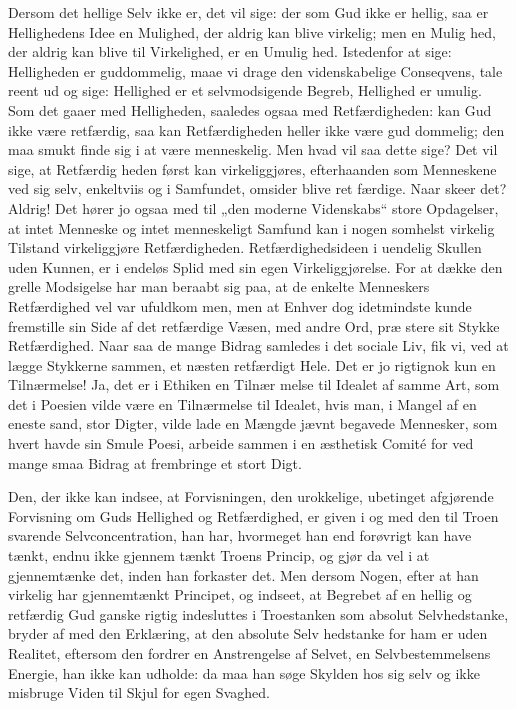 \documentclass[12pt]{book}
\newcommand{\opage}[1]{\marginnote{\footnotesize\textit{[#1]}}}
\begin{document}
Dersom det hellige Selv ikke er, det vil sige: der\-%
som Gud ikke er hellig, saa er Hellighedens Idee en
Mulighed, der aldrig kan blive virkelig; men en Mulig\-%
hed, der aldrig kan blive til Virkelighed, er en Umulig\-%
hed. Istedenfor at sige: Helligheden er guddommelig,
maae vi drage den videnskabelige Conseqvens, tale reent
ud og sige: Hellighed er et selvmodsigende Begreb,
Hellighed er umulig. Som det gaaer med Helligheden,
saaledes ogsaa med Retfærdigheden: kan Gud ikke være
retfærdig, saa kan Retfærdigheden heller ikke være gud\-%
dommelig; den maa smukt finde sig i at være menneskelig.
Men hvad vil saa dette sige? Det vil sige, at Retfærdig\-%
heden først kan virkeliggjøres, efterhaanden som Menneskene
ved sig selv, enkeltviis og i Samfundet, omsider blive ret\-%
færdige. Naar skeer det? Aldrig! Det hører jo ogsaa med
til „den moderne Videnskabs“ store Opdagelser, at intet
Menneske og intet menneskeligt Samfund kan i nogen\-%
somhelst virkelig Tilstand virkeliggjøre Retfærdigheden.
\opage{114}\setcounter{footnote}{0}%
Retfærdighedsideen i uendelig Skullen uden Kunnen, er i
endeløs Splid med sin egen Virkeliggjørelse. For at
dække den grelle Modsigelse har man beraabt sig paa,
at de enkelte Menneskers Retfærdighed vel var ufuldkom\-%
men, men at Enhver dog idetmindste kunde fremstille
sin Side af det retfærdige Væsen, med andre Ord, præ\-%
stere sit Stykke Retfærdighed. Naar saa de mange Bidrag
samledes i det sociale Liv, fik vi, ved at lægge Stykkerne
sammen, et næsten retfærdigt Hele. Det er jo rigtignok
kun en Tilnærmelse! Ja, det er i Ethiken en Tilnær\-%
melse til Idealet af samme Art, som det i Poesien vilde
være en Tilnærmelse til Idealet, hvis man, i Mangel af
en eneste sand, stor Digter, vilde lade en Mængde
jævnt begavede Mennesker, som hvert havde sin Smule
Poesi, arbeide sammen i en æsthetisk Comité for ved
mange smaa Bidrag at frembringe et stort Digt.

Den, der ikke kan indsee, at Forvisningen, den
urokkelige, ubetinget afgjørende Forvisning om Guds
Hellighed og Retfærdighed, er given i og med den til
Troen svarende Selvconcentration, han har, hvormeget
han end forøvrigt kan have tænkt, endnu ikke gjennem\-%
tænkt Troens Princip, og gjør da vel i at gjennemtænke det,
inden han forkaster det. Men dersom Nogen, efter at
han virkelig har gjennemtænkt Principet, og indseet, at
Begrebet af en hellig og retfærdig Gud ganske rigtig
indesluttes i Troestanken som absolut Selvhedstanke,
bryder af med den Erklæring, at den absolute Selv\-%
hedstanke for ham er uden Realitet, eftersom den fordrer
en Anstrengelse af Selvet, en Selvbestemmelsens Energie,
han ikke kan udholde: da maa han søge Skylden hos sig
selv og ikke misbruge Viden til Skjul for egen Svaghed.
\end{document}
